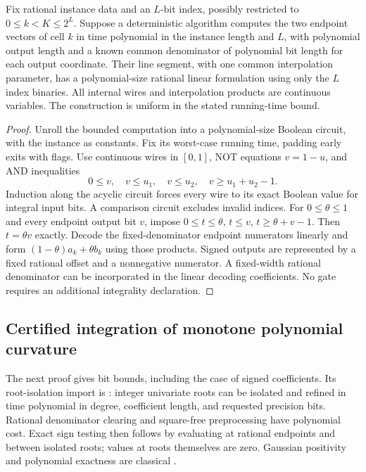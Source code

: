 \begin{lemma}\label{lem:indexed-compiler}
Fix rational instance data and an $L$-bit index, possibly restricted to
$0\le k<K\le2^L$. Suppose a deterministic algorithm computes the two
endpoint vectors of cell $k$ in time polynomial in the instance length
and $L$, with polynomial output length and a known common denominator
of polynomial bit length for each output coordinate. Their line segment, with one common
interpolation parameter, has a polynomial-size rational linear
formulation using only the $L$ index binaries. All internal wires and
interpolation products are continuous variables. The construction is
uniform in the stated running-time bound.
\end{lemma}
\begin{proof}
Unroll the bounded computation into a polynomial-size Boolean circuit,
with the instance as constants. Fix its worst-case running time, padding
early exits with flags. Use continuous wires in $[0,1]$, NOT equations
$v=1-u$, and AND inequalities
\[
 0\le v,\quad v\le u_1,\quad v\le u_2,\quad v\ge u_1+u_2-1.
\]
Induction along the acyclic circuit forces every wire to its exact
Boolean value for integral input bits. A comparison circuit excludes
invalid indices. For $0\le\theta\le1$ and every endpoint output bit
$v$, impose $0\le t\le\theta$, $t\le v$, $t\ge\theta+v-1$.
Then $t=\theta v$ exactly. Decode the fixed-denominator endpoint
numerators linearly and form $(1-\theta)a_k+\theta b_k$ using those
products. Signed outputs are represented by a fixed rational offset
and a nonnegative numerator. A fixed-width rational denominator can
be incorporated in the linear decoding coefficients. No gate requires
an additional integrality declaration.
\end{proof}

\subsection{Certified integration of monotone polynomial curvature}

The next proof gives bit bounds, including the case of signed
coefficients. Its root-isolation import is
\citet[Theorem 36 in the linked preprint]{sagraloff2015}: integer univariate roots can be
isolated and refined in time polynomial in degree, coefficient length,
and requested precision bits. Rational denominator clearing and
square-free preprocessing have polynomial cost. Exact sign testing
then follows by evaluating at rational endpoints and between isolated
roots; values at roots themselves are zero. Gaussian positivity and
polynomial exactness are classical \citep[Section 3.5(v)]{dlmfquadrature}.


